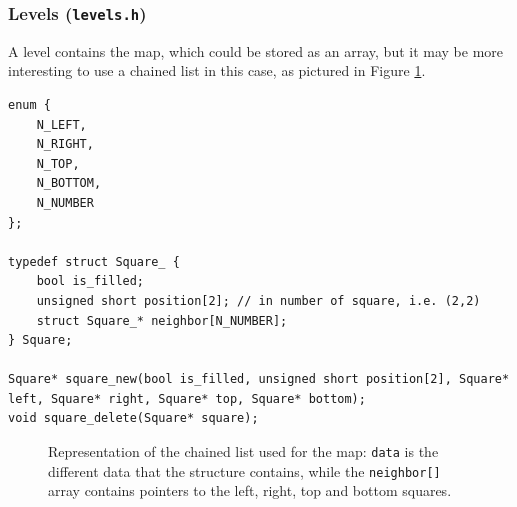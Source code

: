 \documentclass[12pt,a4paper]{article}
\begin{document}
\subsubsection{Levels (\texttt{levels.h})}

A level contains the map, which could be stored as an array, but it may be more interesting to use a chained list in this case, as pictured in Figure \ref{fig:def:chainx}.

\begin{verbatim}
enum {
	N_LEFT,
	N_RIGHT,
	N_TOP,
	N_BOTTOM,
	N_NUMBER
};

typedef struct Square_ {
	bool is_filled;
	unsigned short position[2]; // in number of square, i.e. (2,2)
	struct Square_* neighbor[N_NUMBER]; 
} Square;

Square* square_new(bool is_filled, unsigned short position[2], Square* left, Square* right, Square* top, Square* bottom);
void square_delete(Square* square);
\end{verbatim}

\begin{figure}[!h]
\centering
{}
\caption{Representation of the chained list used for the map: \texttt{data} is the different data that the structure contains, while the \texttt{neighbor[]} array contains pointers to the left, right, top and bottom squares.}
\label{fig:def:chainx}
\end{figure}
\end{document}

